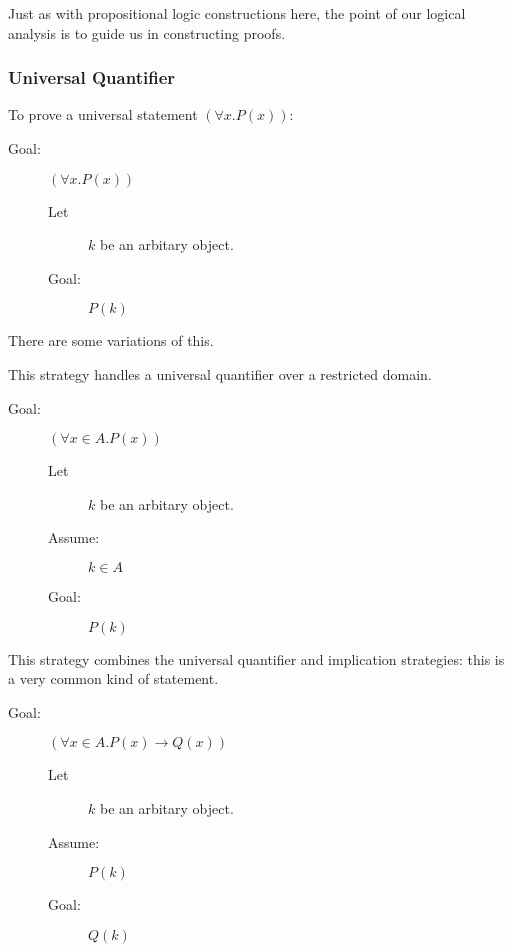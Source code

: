 \documentclass[12pt]{article}
\begin{document}
Just as with propositional logic constructions here, the point of our logical analysis is to guide us in constructing proofs.

\subsubsection{Universal Quantifier}

\noindent To prove a universal statement $(\forall x.P(x))$:

\begin{description}

\item[Goal:]  $(\forall x.P(x))$

\begin{description}

\item[Let] $k$ be an arbitary object.

\item[Goal:]  $P(k)$

\end{description}

\end{description}



\noindent There are some variations of this.

\noindent This strategy handles a universal quantifier over a restricted domain.

\begin{description}

\item[Goal:]  $(\forall x\in A.P(x))$

\begin{description}

\item[Let] $k$ be an arbitary object.

\item[Assume:] $k \in A$

\item[Goal:]  $P(k)$

\end{description}

\end{description}

\noindent This strategy combines the universal quantifier and implication strategies:
\noindent this is a very common kind of statement.

\begin{description}

\item[Goal:]  $(\forall x\in A.P(x)\rightarrow Q(x))$

\begin{description}

\item[Let] $k$ be an arbitary object.

\item[Assume:] $P(k)$

\item[Goal:]  $Q(k)$

\end{description}

\end{description}
\end{document}
